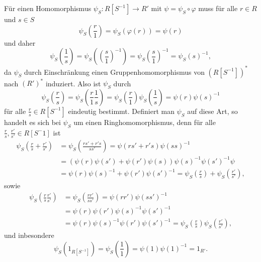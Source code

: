 \documentclass[a4paper,10pt]{article}
\theoremstyle{definition}
\begin{document}
Für einen Homomorphismus $\psi_S : R[S^{-1}] \rightarrow R'$ mit $\psi = \psi_S \circ \varphi$ muss für alle $r \in R$ und $s \in S$
\[
 \psi_S\left(\frac{r}{1}\right)
 = \psi_S( \varphi(r) )
 = \psi(r)
\]
und daher
\[
 \psi_S\left(\frac{1}{s}\right)
 = \psi_S\left( \left (\frac{s}{1} \right)^{-1} \right)
 = \psi_S\left( \frac{s}{1} \right)^{-1}
 = \psi_S(s)^{-1},
\]
da $\psi_S$ durch Einschränkung einen Gruppenhomomorphismus von $(R[S^{-1}])^*$ nach $(R')^*$ induziert. Also ist $\psi_S$ durch
\[
 \psi_S\left(\frac{r}{s}\right)
 = \psi_S\left(\frac{r}{1} \frac{1}{s}\right)
 = \psi_S\left(\frac{r}{1}\right) \psi_S\left(\frac{1}{s}\right)
 = \psi(r)\psi(s)^{-1}
\]
für alle $\frac{r}{s} \in R[S^{-1}]$ eindeutig bestimmt. Definiert man $\psi_S$ auf diese Art, so handelt es sich bei $\psi_S$ um einen Ringhomomorphismus, denn für alle $\frac{r}{s}, \frac{r'}{s'} \in R[S^-1]$ ist
\begin{align*}
 \psi_S\left( \frac{r}{s} + \frac{r'}{s'} \right)
 &= \psi_S\left( \frac{rs' + r's}{ss'} \right)
 = \psi(rs' + r's)\psi(ss)^{-1} \\
 &= \left( \psi(r)\psi(s') + \psi(r')\psi(s) \right) \psi(s)^{-1}\psi(s')^{-1} \psi \\
 &= \psi(r)\psi(s)^{-1} + \psi(r')\psi(s')^{-1}
 = \psi_S\left(\frac{r}{s}\right) + \psi_S\left(\frac{r'}{s'}\right),
\end{align*}
sowie
\begin{align*}
 \psi_S\left(\frac{r}{s} \frac{r'}{s'}\right)
 &= \psi_S\left(\frac{rr'}{ss'}\right)
 = \psi(rr')\psi(ss')^{-1} \\
 &= \psi(r)\psi(r')\psi(s)^{-1}\psi(s')^{-1} \\
 &= \psi(r)\psi(s)^{-1} \psi(r')\psi(s')^{-1}
 = \psi_S\left(\frac{r}{s}\right) \psi_S\left(\frac{r'}{s'}\right),
\end{align*}
und inbesondere
\[
 \psi_S\left(1_{R[S^{-1}]}\right)
 = \psi_S\left(\frac{1}{1}\right)
 = \psi(1) \psi(1)^{-1}
 = 1_{R'}.
\]





\section{}





\section{}
\end{document}
